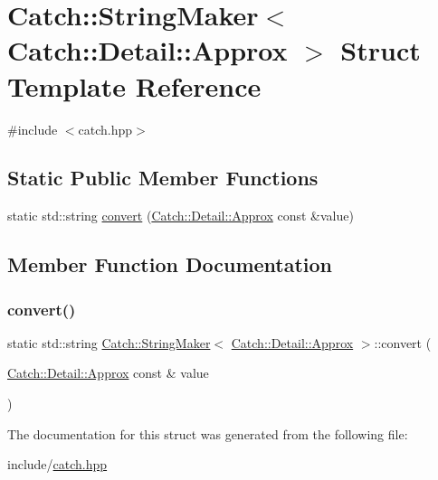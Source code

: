 \hypertarget{structCatch_1_1StringMaker_3_01Catch_1_1Detail_1_1Approx_01_4}{}\section{Catch\+:\+:String\+Maker$<$ Catch\+:\+:Detail\+:\+:Approx $>$ Struct Template Reference}
\label{structCatch_1_1StringMaker_3_01Catch_1_1Detail_1_1Approx_01_4}


{\ttfamily \#include $<$catch.\+hpp$>$}

\subsection*{Static Public Member Functions}
\begin{DoxyCompactItemize}
\item 
static std\+::string \mbox{\hyperlink{structCatch_1_1StringMaker_3_01Catch_1_1Detail_1_1Approx_01_4_a8e5015720682fecfbff0f05de19a698f}{convert}} (\mbox{\hyperlink{classCatch_1_1Detail_1_1Approx}{Catch\+::\+Detail\+::\+Approx}} const \&value)
\end{DoxyCompactItemize}


\subsection{Member Function Documentation}
\mbox{\label{structCatch_1_1StringMaker_3_01Catch_1_1Detail_1_1Approx_01_4_a8e5015720682fecfbff0f05de19a698f}} 
\subsubsection{\texorpdfstring{convert()}{convert()}}
{\footnotesize\ttfamily static std\+::string \mbox{\hyperlink{structCatch_1_1StringMaker}{Catch\+::\+String\+Maker}}$<$ \mbox{\hyperlink{classCatch_1_1Detail_1_1Approx}{Catch\+::\+Detail\+::\+Approx}} $>$\+::convert (\begin{DoxyParamCaption}\item[{\mbox{\hyperlink{classCatch_1_1Detail_1_1Approx}{Catch\+::\+Detail\+::\+Approx}} const \&}]{value }\end{DoxyParamCaption})\hspace{0.3cm}{\ttfamily [static]}}



The documentation for this struct was generated from the following file\+:\begin{DoxyCompactItemize}
\item 
include/\mbox{\hyperlink{catch_8hpp}{catch.\+hpp}}\end{DoxyCompactItemize}
